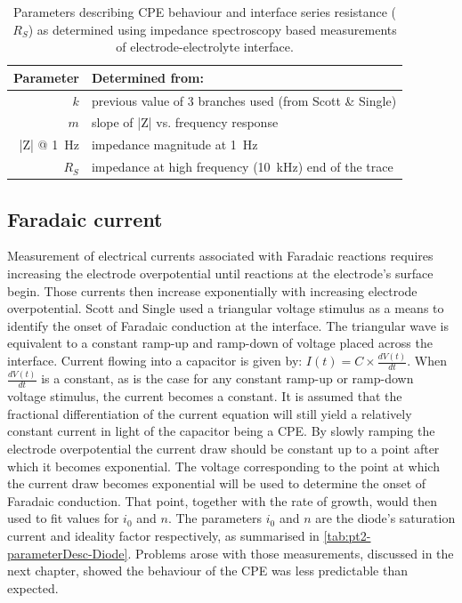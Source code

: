    \begin{table}
      \begin{center}
        \begin{tabular} {r | l}
          Parameter & Determined from:\\
          \hline
          $k$ & previous value of 3 branches used (from Scott \& Single)\\
          $m$ & slope of |Z| vs. frequency response\\
          |Z| @ \SI{1}{\hertz} & impedance magnitude at \SI{1}{\hertz}\\
          $R_S$ & impedance at high frequency (\SI{10}{\kilo\hertz}) end of the trace
        \end{tabular}
      \end{center}
      \caption{\label{tab:pt2-parameterDesc-CPE}Parameters describing CPE behaviour and interface series resistance ($R_S$) as determined using impedance spectroscopy based measurements of electrode-electrolyte interface.}
    \end{table}


  \subsection{Faradaic current}


    Measurement of electrical currents associated with Faradaic reactions requires increasing the electrode overpotential until reactions at the electrode's surface begin.
    Those currents then increase exponentially with increasing electrode overpotential.
    Scott and Single used a triangular voltage stimulus as a means to identify the onset of Faradaic conduction at the interface.
    The triangular wave is equivalent to a constant ramp-up and ramp-down of voltage placed across the interface.
    Current flowing into a capacitor is given by: $I(t) = C \times \frac{dV(t)}{dt}$.
    When $\frac{dV(t)}{dt}$ is a constant, as is the case for any constant ramp-up or ramp-down voltage stimulus, the current becomes a constant.
    It is assumed that the fractional differentiation of the current equation will still yield a relatively constant current in light of the capacitor being a CPE.
    By slowly ramping the electrode overpotential the current draw should be constant up to a point after which it becomes exponential.
    The voltage corresponding to the point at which the current draw becomes exponential will be used to determine the onset of Faradaic conduction.
    That point, together with the rate of growth, would then used to fit values for $i_0$ and $n$.
    The parameters $i_0$ and $n$ are the diode's saturation current and ideality factor respectively, as summarised in \cref{tab:pt2-parameterDesc-Diode}.
    Problems arose with those measurements, discussed in the next chapter, showed the behaviour of the CPE was less predictable than expected.

